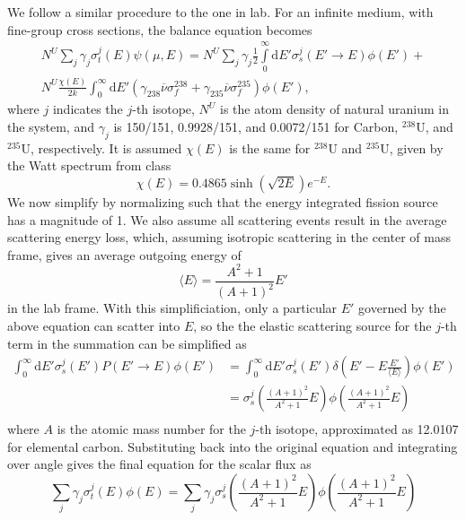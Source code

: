 \documentclass[12pt]{article}
\renewcommand{\d}{\mathrm{d}}
\newcommand{\ra}{\rightarrow}
\newenvironment{solnum}[2][Solution]{\begin{trivlist}
\item[\hskip \labelsep {\bfseries #1}\hskip \labelsep {\bfseries #2:}]\hspace{0.3in}\newline\newline}{\end{trivlist}}
\newcommand{\iso}[2]{\ensuremath{^{#2}\text{#1}}}
\newcommand{\nubar}{\ensuremath{\overline{\nu}}}
\begin{document}
\begin{solnum}{1}
We follow a similar procedure to the one in lab.  For an infinite medium, with
fine-group cross sections, the balance equation becomes
\begin{multline}
    N^{U}\sum_{j} \gamma_j \sigma_t^j(E) \psi(\mu,E) = N^{U}\sum_{j} \gamma_j
    \frac{1}{2} \int\limits_0^\infty \d E' \sigma_s^j (E'\ra E)\phi(E') + \\
    N^U\frac{\chi(E)}{2k} \int_0^\infty\d E' \left(\gamma_{238}\nubar\sigma_f^{238} +
    \gamma_{235}\nubar\sigma_f^{235}\right)\phi(E'),
\end{multline}
where $j$ indicates the $j$-th isotope, $N^U$ is the atom density of natural uranium
in the system, and $\gamma_j$ is 150/151, 0.9928/151, and 0.0072/151 for Carbon, \iso{U}{238},
and \iso{U}{235}, respectively.  It is assumed $\chi(E)$ is the same for \iso{U}{238}
and \iso{U}{235}, given by the Watt spectrum from class
\begin{equation}
    \chi(E) = 0.4865 \sinh(\sqrt{2E})e^{-E}.
\end{equation}
We now simplify by normalizing such that the energy integrated fission source has a
magnitude of 1.  We also assume all scattering events result in the average
scattering energy loss, which, assuming isotropic scattering in the center of mass
frame, gives an average outgoing energy of 
\begin{equation}
    \langle E\rangle = \frac{A^2 + 1}{(A+1)^2}E'
\end{equation}
in the lab frame.  With this simplificiation, only a particular $E'$ governed by the above equation can scatter
into $E$, so the the elastic scattering source for the $j$-th term in the summation can be simplified as
\begin{align}
    \int_0^\infty \d E' \sigma_s^j(E')P(E'\ra E)\phi(E') &= \int_0^\infty \d
    E'\sigma_s^j(E')\delta\left(E' - E \frac{E'}{\langle E \rangle}\right) \phi(E') \\
    &= \sigma_s^j\left(\frac{(A+1)^2}{A^2+1}E\right) \phi\left(\frac{(A+1)^2}{A^2+1}E\right) \\
\end{align}
where $A$ is the atomic mass number for the $j$-th isotope, approximated as 12.0107 for elemental carbon.
Substituting back into the original equation and integrating over angle gives the
final equation for the scalar flux as
\begin{equation}
    \sum_{j} \gamma_j \sigma_t^j(E) \phi(E) = \sum_{j} \gamma_j \sigma_s^j \left(\frac{(A+1)^2}{A^2+1}E\right) \phi\left(\frac{(A+1)^2}{A^2+1}E\right) 

\end{equation}
\end{solnum}
\end{document}
